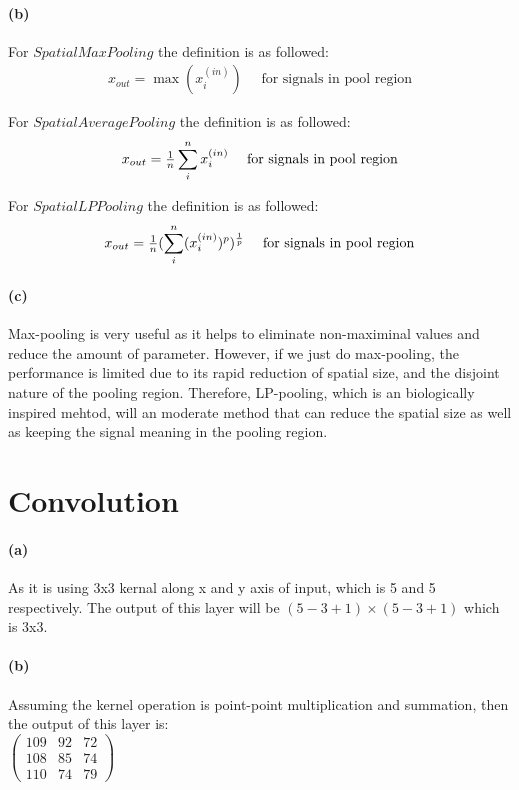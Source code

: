 \documentclass{article}
\begin{document}
\paragraph{(b)} For $SpatialMaxPooling$ the definition is as followed:
\begin{equation}
\begin{matrix}
x_{out} = \max(x_i^{(in)}) \quad \text{ for signals in pool region}
\end{matrix}
\end{equation}

For $SpatialAveragePooling$ the definition is as followed:
\begin{equation}
\begin{matrix}
x_{out} = {1\over n}\displaystyle\sum_i^nx_i^{(in)} \quad \text{ for signals in pool region}
\end{matrix}
\end{equation}

For $SpatialLPPooling$ the definition is as followed:
\begin{equation}
\begin{matrix}
x_{out} = {1\over n}(\displaystyle\sum_i^n(x_i^{(in)})^p)^{1\over p} \quad \text{ for signals in pool region}
\end{matrix}
\end{equation}
\paragraph{(c)} Max-pooling is very useful as it helps to eliminate non-maximinal values and reduce the amount of parameter. However, if we just do max-pooling, the performance is limited due to its rapid reduction of spatial size, and the disjoint nature of the pooling region. Therefore, LP-pooling, which is an biologically inspired mehtod, will an moderate method that can reduce the spatial size as well as keeping the signal meaning in the pooling region.

\section{Convolution}
\paragraph{(a)} As it is using 3x3 kernal along x and y axis of input, which is 5 and 5 respectively. The output of this layer will be $(5-3+1)\times(5-3+1)$ which is 3x3.\\
\paragraph{(b)} Assuming the kernel operation is point-point multiplication and summation, then the output of this layer is:\\
$\begin{pmatrix}
  109 & 92 & 72 \\[0.4em]
  108 & 85 & 74 \\[0.4em]
  110 & 74 & 79
\end{pmatrix}$ \\
\end{document}
